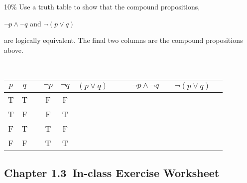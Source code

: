 \documentclass[a4paper,12pt]{book}
\newcommand{\laChapter}{1.3\ }
\begin{document}
        \begin{question}{6}{10\%}
                Use a truth table to show that the compound propositions,

                \begin{center}
                $ \neg p \land \neg q $
                \tab and \tab
                $ \neg ( p \lor q ) $
                \end{center}
                are logically equivalent. The final two columns are
                the compound propositions above.
        \end{question}
        ~\\
        \begin{tabular}{ | c | c | c | c | c | c  c | c | c | c | c | c | }
            \hline
            $p$ &
            $q$ & &

            $\neg p$ &
            $\neg q$ &

            $(p \lor q)$ & & &

            $ \neg p \land \neg q $ & &
            $ \neg ( p \lor q ) $
            \\ \hline

            T & T & & F & F & & & & & & \\ \hline
            T & F & & F & T & & & & & & \\ \hline
            F & T & & T & F & & & & & & \\ \hline
            F & F & & T & T & & & & & & \\ \hline
        \end{tabular}

    \newpage
    \begin{center} \section*{Chapter \laChapter In-class Exercise Worksheet} \end{center}

    \iftoggle{answerkey}{
      \begin{answer} \begin{center} ANSWER KEY \end{center} \end{answer}
    }{}
\end{document}
